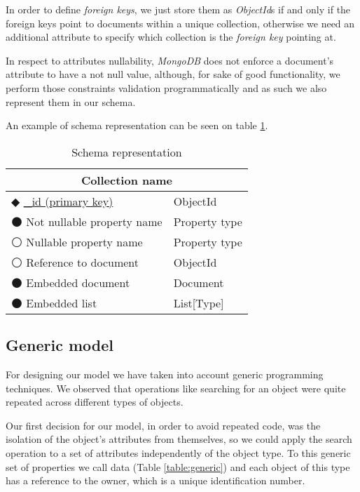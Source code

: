     In order to define \emph{foreign keys}, we just store them as \emph{ObjectId}s if and only if the foreign keys point to documents within a unique collection, otherwise we need an additional attribute to specify which collection is the \emph{foreign key} pointing at.

    In respect to attributes nullability, \emph{MongoDB} does not enforce a document's attribute to have a not null value, although, for sake of good functionality, we perform those constraints validation programmatically and as such we also represent them in our schema.
    
    An example of schema representation can be seen on table \ref{table:schema}.

\begin{table}[!htb]
\centering
\caption{Schema representation}
\label{table:schema}
    \begin{tabular}{|ll|}
        \hline
        \multicolumn{2}{|c|}{\textbf{Collection name}}            \\ \hline
        $\Diamondblack$ \underline{\_id (primary key)} & ObjectId \\ 
        $\medbullet$ Not nullable property name & Property type   \\ 
        $\medcirc$ Nullable property name       & Property type   \\
        $\medcirc$ Reference to document        & ObjectId        \\
        $\medbullet$ Embedded document          & Document        \\ 
        $\medbullet$ Embedded list              & List[Type]      \\ \hline
    \end{tabular}
\end{table}

\subsection {Generic model}

For designing our model we have taken into account generic programming techniques. We observed that operations like searching for an object were quite repeated across different types of objects. 

Our first decision for our model, in order to avoid repeated code, was the isolation of the object's attributes from themselves, so we could apply the search operation to a set of attributes independently of the object type. To this generic set of properties we call data (Table \ref{table:generic}) and each object of this type has a reference to the owner, which is a unique identification number.

